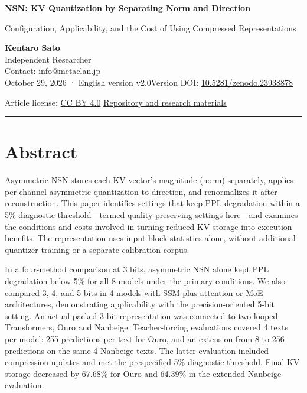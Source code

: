 \documentclass[10pt,a4paper]{article}
\begin{document}
\fontsize{10.7}{15.3}\selectfont\thispagestyle{first}
{\raggedright\sffamily\bfseries\color{ink}\fontsize{22}{27}\selectfont NSN: KV Quantization by Separating Norm and Direction\par}

{\raggedright\sffamily\fontsize{13}{17}\selectfont\color{accent} Configuration, Applicability, and the Cost of Using Compressed Representations\par}

{\small \textbf{Kentaro Sato}\\
Independent Researcher\\
Contact: info@metaclan.jp\\
October 29, 2026 · English version v2.0\quad\textbar\quad Version DOI: \href{https://doi.org/10.5281/zenodo.23938878}{10.5281/zenodo.23938878}\par}
{\small Article license: \href{https://creativecommons.org/licenses/by/4.0/}{CC BY 4.0} \quad\textbar\quad \href{https://github.com/metaSATOKEN/nsn/tree/c37d39ea0106274d9f661cfbb268b0ed05319846}{Repository and research materials}\par}\smallskip\hrule\medskip

\section{Abstract}\label{abstract}

Asymmetric NSN stores each KV vector's magnitude (norm) separately, applies per-channel asymmetric quantization to direction, and renormalizes it after reconstruction. This paper identifies settings that keep PPL degradation within a 5\% diagnostic threshold---termed quality-preserving settings here---and examines the conditions and costs involved in turning reduced KV storage into execution benefits. The representation uses input-block statistics alone, without additional quantizer training or a separate calibration corpus.

In a four-method comparison at 3 bits, asymmetric NSN alone kept PPL degradation below 5\% for all 8 models under the primary conditions. We also compared 3, 4, and 5 bits in 4 models with SSM-plus-attention or MoE architectures, demonstrating applicability with the precision-oriented 5-bit setting. An actual packed 3-bit representation was connected to two looped Transformers, Ouro and Nanbeige. Teacher-forcing evaluations covered 4 texts per model: 255 predictions per text for Ouro, and an extension from 8 to 256 predictions on the same 4 Nanbeige texts. The latter evaluation included compression updates and met the prespecified 5\% diagnostic threshold. Final KV storage decreased by 67.68\% for Ouro and 64.39\% in the extended Nanbeige evaluation.
\end{document}
